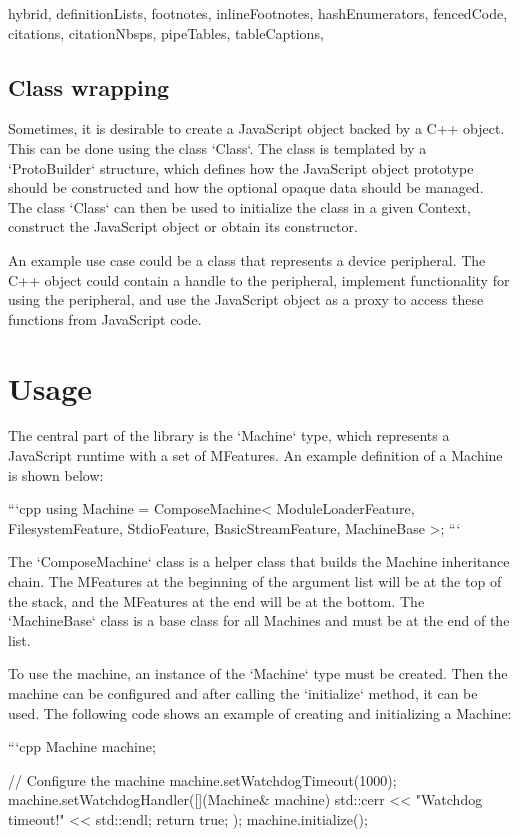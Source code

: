 \begin{markdown*}{%
  hybrid,
  definitionLists,
  footnotes,
  inlineFootnotes,
  hashEnumerators,
  fencedCode,
  citations,
  citationNbsps,
  pipeTables,
  tableCaptions,
}
\subsection{Class wrapping} \label{sub:class-wrapping}

Sometimes, it is desirable to create a JavaScript object backed by a C++ object. This can be done using the class `Class`. The class is templated by a `ProtoBuilder` structure, which defines how the JavaScript object prototype should be constructed and how the optional opaque data should be managed. The class `Class` can then be used to initialize the class in a given Context, construct the JavaScript object or obtain its constructor.

An example use case could be a class that represents a device peripheral. The C++ object could contain a handle to the peripheral, implement functionality for using the peripheral, and use the JavaScript object as a proxy to access these functions from JavaScript code.


\section{Usage} \label{sec:machine-usage}

The central part of the library is the `Machine` type, which represents a JavaScript runtime with a set of MFeatures. An example definition of a Machine is shown below:

```cpp
using Machine = ComposeMachine<
    ModuleLoaderFeature,
    FilesystemFeature,
    StdioFeature,
    BasicStreamFeature,
    MachineBase
>;
```

The `ComposeMachine` class is a helper class that builds the Machine inheritance chain. The MFeatures at the beginning of the argument list will be at the top of the stack, and the MFeatures at the end will be at the bottom. The `MachineBase` class is a base class for all Machines and must be at the end of the list.

To use the machine, an instance of the `Machine` type must be created. Then the machine can be configured and after calling the `initialize` method, it can be used. The following code shows an example of creating and initializing a Machine:

```cpp
Machine machine;

// Configure the machine
machine.setWatchdogTimeout(1000);
machine.setWatchdogHandler([](Machine& machine) {
    std::cerr << "Watchdog timeout!" << std::endl;
    return true;
});
machine.initialize();


\end{markdown*}
